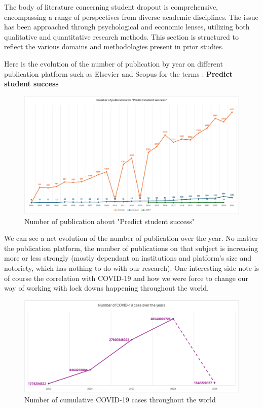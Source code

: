 \documentclass[../../main.tex]{subfiles}
\begin{document}
The body of literature concerning student dropout is comprehensive, encompassing a range of perspectives from diverse academic disciplines. The issue has been approached through psychological and economic lenses, utilizing both qualitative and quantitative research methods. This section is structured to reflect the various domains and methodologies present in prior studies.

Here is the evolution of the number of publication by year on different publication platform such as Elsevier and Scopus for the terms : \textbf{Predict student success}
\begin{figure}[H]
    \centering
    \includegraphics[width=1\linewidth]{res//graph/numberOfPub.png}
    \caption{Number of publication about "Predict student success"}
    \label{fig:nb_pub}
\end{figure}
We can see a net evolution of the number of publication over the year. No matter the publication platform, the number of publications on that subject is increasing more or less strongly (mostly dependant on institutions and platform's size and notoriety, which has nothing to do with our research). One interesting side note is of course the correlation with COVID-19 and how we were force to change our way of working with lock downs happening throughout the world.
\begin{figure}[H]
    \centering
    \includegraphics[width=1\linewidth]{res//graph/covid19_cases.png}
    \caption{Number of cumulative COVID-19 cases throughout the world \cite{noauthor_covid-19_nodate}}
    \label{fig:nb_covid19_cases}
\end{figure}
\end{document}
